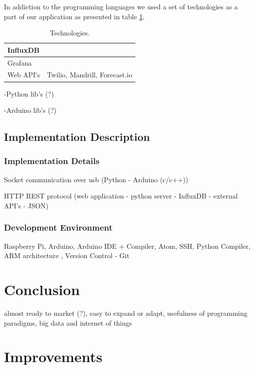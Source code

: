 \documentclass[12pt]{report}
\begin{document}
In addiction to the programming languages we used a set of technologies as a part of our application as presented in table \ref{tab:tech}.

\begin{table}[H]
\begin{tabularx}{0.8\textwidth}{ |l|X| }
  	\hline
  	InfluxDB  &   \\
 	\hline
 	Grafana  &   \\
  	\hline
 	Web API's & Twilio, Mandrill, Forecast.io   \\
	\hline
\end{tabularx}
	\caption{Technologies.}
  	\label{tab:tech}
\end{table}

-Python lib's (?)

-Arduino lib's (?)

\section{Implementation Description}

\subsection{Implementation Details}

Socket communication over usb (Python - Arduino (c/c++))

HTTP REST protocol  (web application - python server - InfluxDB - external API's - JSON)

\subsection{Development Environment}

Raspberry Pi, Arduino, Arduino IDE  + Compiler, Atom, SSH, Python Compiler, ARM architecture , Version Control - Git

\newpage
\chapter{Conclusion}

almost ready to market (?), easy to expand or adapt, usefulness of programming paradigms, big data and internet of things

\newpage
\chapter{Improvements}
\end{document}

